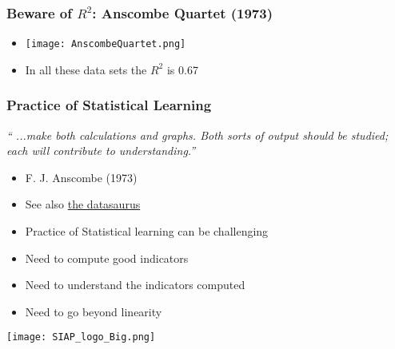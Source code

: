 \documentclass[xcolor=x11names,compress, aspectratio=169]{beamer}
\renewcommand{\(}{\begin{columns}}
\renewcommand{\)}{\end{columns}}
\newcommand{\<}[1]{\begin{column}{#1}}
\renewcommand{\>}{\end{column}}
\begin{document}
\begin{frame} %
\frametitle{Beware of $R^2$: Anscombe Quartet (1973)}
\pause
 \begin{itemize}
  \item<+->[] \texttt{[image: AnscombeQuartet.png]}
  \item<+->[] In all these data sets the $R^2$ is 0.67
 \end{itemize}
\end{frame}


\begin{frame} %
\frametitle{Practice of Statistical Learning}
\begin{center}
\emph{`` ...make both calculations and graphs. Both sorts of output should be studied; each will contribute to understanding.''}
\end{center}
\begin{itemize}
 \item<+->[]\scriptsize{F. J. Anscombe (1973)}
 \item<+->[] \scriptsize{See also \href{https://www.r-bloggers.com/2017/05/the-datasaurus-dozen/}{the datasaurus}}
  \item<+->Practice of Statistical learning can be challenging
  \item<+->[$\hookrightarrow$] Need to compute good indicators
  \item<+->[$\hookrightarrow$] Need to understand the indicators computed
  \item<+->[$\hookrightarrow$] Need to go beyond linearity
 \end{itemize}
\end{frame}


\begin{frame}
\Large{ \color{siap}{Machine Learning for Official Statistics and SDGs}}

\hspace{1cm}


\hspace{2cm}
\begin{center}

\texttt{[image: SIAP\_logo\_Big.png]}

\end{center}
\end{frame}
\end{document}
